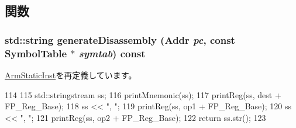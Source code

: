 \subsection{関数}
\hypertarget{classArmISA_1_1FpRegRegRegOp_a95d323a22a5f07e14d6b4c9385a91896}{
\subsubsection[{generateDisassembly}]{\setlength{\rightskip}{0pt plus 5cm}std::string generateDisassembly ({\bf Addr} {\em pc}, \/  const SymbolTable $\ast$ {\em symtab}) const}}
\label{classArmISA_1_1FpRegRegRegOp_a95d323a22a5f07e14d6b4c9385a91896}


\hyperlink{classArmISA_1_1ArmStaticInst_a95d323a22a5f07e14d6b4c9385a91896}{ArmStaticInst}を再定義しています。


\begin{DoxyCode}
114 {
115     std::stringstream ss;
116     printMnemonic(ss);
117     printReg(ss, dest + FP_Reg_Base);
118     ss << ", ";
119     printReg(ss, op1 + FP_Reg_Base);
120     ss << ", ";
121     printReg(ss, op2 + FP_Reg_Base);
122     return ss.str();
123 }
\end{DoxyCode}


